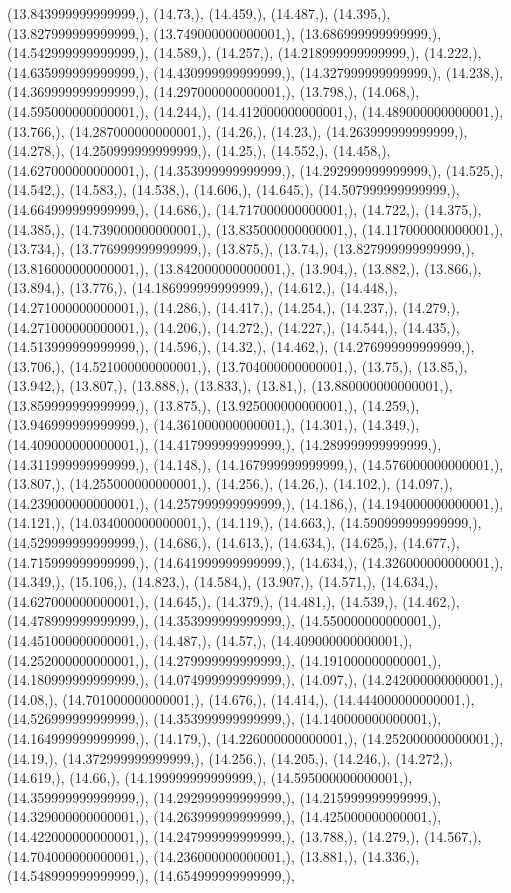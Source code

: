 \documentclass{article}
\begin{document}
(13.843999999999999,), (14.73,), (14.459,), (14.487,), (14.395,), (13.827999999999999,), (13.749000000000001,), (13.686999999999999,), (14.542999999999999,), (14.589,), (14.257,), (14.218999999999999,), (14.222,), (14.635999999999999,), (14.430999999999999,), (14.327999999999999,), (14.238,), (14.369999999999999,), (14.297000000000001,), (13.798,), (14.068,), (14.595000000000001,), (14.244,), (14.412000000000001,), (14.489000000000001,), (13.766,), (14.287000000000001,), (14.26,), (14.23,), (14.263999999999999,), (14.278,), (14.250999999999999,), (14.25,), (14.552,), (14.458,), (14.627000000000001,), (14.353999999999999,), (14.292999999999999,), (14.525,), (14.542,), (14.583,), (14.538,), (14.606,), (14.645,), (14.507999999999999,), (14.664999999999999,), (14.686,), (14.717000000000001,), (14.722,), (14.375,), (14.385,), (14.739000000000001,), (13.835000000000001,), (14.117000000000001,), (13.734,), (13.776999999999999,), (13.875,), (13.74,), (13.827999999999999,), (13.816000000000001,), (13.842000000000001,), (13.904,), (13.882,), (13.866,), (13.894,), (13.776,), (14.186999999999999,), (14.612,), (14.448,), (14.271000000000001,), (14.286,), (14.417,), (14.254,), (14.237,), (14.279,), (14.271000000000001,), (14.206,), (14.272,), (14.227,), (14.544,), (14.435,), (14.513999999999999,), (14.596,), (14.32,), (14.462,), (14.276999999999999,), (13.706,), (14.521000000000001,), (13.704000000000001,), (13.75,), (13.85,), (13.942,), (13.807,), (13.888,), (13.833,), (13.81,), (13.880000000000001,), (13.859999999999999,), (13.875,), (13.925000000000001,), (14.259,), (13.946999999999999,), (14.361000000000001,), (14.301,), (14.349,), (14.409000000000001,), (14.417999999999999,), (14.289999999999999,), (14.311999999999999,), (14.148,), (14.167999999999999,), (14.576000000000001,), (13.807,), (14.255000000000001,), (14.256,), (14.26,), (14.102,), (14.097,), (14.239000000000001,), (14.257999999999999,), (14.186,), (14.194000000000001,), (14.121,), (14.034000000000001,), (14.119,), (14.663,), (14.590999999999999,), (14.529999999999999,), (14.686,), (14.613,), (14.634,), (14.625,), (14.677,), (14.715999999999999,), (14.641999999999999,), (14.634,), (14.326000000000001,), (14.349,), (15.106,), (14.823,), (14.584,), (13.907,), (14.571,), (14.634,), (14.627000000000001,), (14.645,), (14.379,), (14.481,), (14.539,), (14.462,), (14.478999999999999,), (14.353999999999999,), (14.550000000000001,), (14.451000000000001,), (14.487,), (14.57,), (14.409000000000001,), (14.252000000000001,), (14.279999999999999,), (14.191000000000001,), (14.180999999999999,), (14.074999999999999,), (14.097,), (14.242000000000001,), (14.08,), (14.701000000000001,), (14.676,), (14.414,), (14.444000000000001,), (14.526999999999999,), (14.353999999999999,), (14.140000000000001,), (14.164999999999999,), (14.179,), (14.226000000000001,), (14.252000000000001,), (14.19,), (14.372999999999999,), (14.256,), (14.205,), (14.246,), (14.272,), (14.619,), (14.66,), (14.199999999999999,), (14.595000000000001,), (14.359999999999999,), (14.292999999999999,), (14.215999999999999,), (14.329000000000001,), (14.263999999999999,), (14.425000000000001,), (14.422000000000001,), (14.247999999999999,), (13.788,), (14.279,), (14.567,), (14.704000000000001,), (14.236000000000001,), (13.881,), (14.336,), (14.548999999999999,), (14.654999999999999,), 
\end{document}
